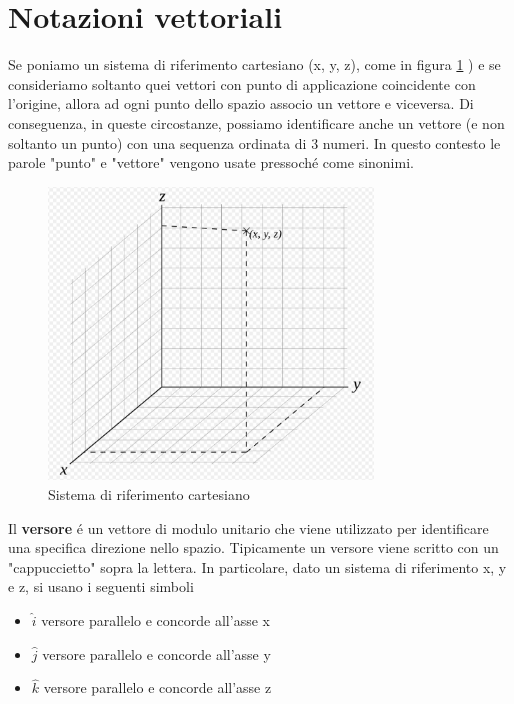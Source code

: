 \documentclass[17pt]{extarticle}
\begin{document}
\section{Notazioni vettoriali}

Se poniamo un sistema di riferimento cartesiano (x, y, z), come in figura \ref{fig:ternaCartesiana}	) e se consideriamo soltanto quei vettori con punto di applicazione coincidente con l'origine, allora ad ogni punto dello spazio associo un vettore e viceversa. Di conseguenza, in queste circostanze, possiamo identificare anche un vettore (e non soltanto un punto) con una sequenza ordinata di 3 numeri. In questo contesto le parole "punto" e "vettore" vengono usate pressoch\'e come sinonimi.



\begin{figure}[b!]		
	\centering
   	\includegraphics[width=3.4in]{SistemaRifCartesiano.png}		%
  	\caption{Sistema di riferimento cartesiano}
   	\label{fig:ternaCartesiana}
\end{figure}


Il {\bf versore} \'e un vettore di modulo unitario che viene utilizzato per identificare una specifica direzione nello spazio. Tipicamente un versore viene scritto con un "cappuccietto" sopra la lettera. In particolare, dato un sistema di riferimento x, y e z, si usano i seguenti simboli
\begin{itemize}
	\item $\hat{i}$ versore parallelo e concorde all'asse x
	\item $\hat{j}$ versore parallelo e concorde all'asse y
	\item $\hat{k}$ versore parallelo e concorde all'asse z
\end{itemize}
\end{document}

